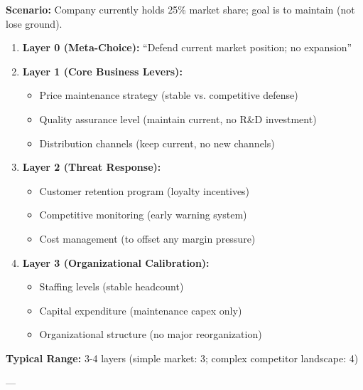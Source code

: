 \documentclass[11pt, a4paper]{article}
\begin{document}
\begin{tcolorbox}[colback=gray!5!white, colframe=gray!75!black, title=Example: Organizational Steady State (e.g., Market Share Maintenance)]

\textbf{Scenario:} Company currently holds 25\% market share; goal is to maintain (not lose ground).

\begin{enumerate}
    \item \textbf{Layer 0 (Meta-Choice):} ``Defend current market position; no expansion''

    \item \textbf{Layer 1 (Core Business Levers):}
    \begin{itemize}[nosep]
        \item Price maintenance strategy (stable vs. competitive defense)
        \item Quality assurance level (maintain current, no R\&D investment)
        \item Distribution channels (keep current, no new channels)
    \end{itemize}

    \item \textbf{Layer 2 (Threat Response):}
    \begin{itemize}[nosep]
        \item Customer retention program (loyalty incentives)
        \item Competitive monitoring (early warning system)
        \item Cost management (to offset any margin pressure)
    \end{itemize}

    \item \textbf{Layer 3 (Organizational Calibration):}
    \begin{itemize}[nosep]
        \item Staffing levels (stable headcount)
        \item Capital expenditure (maintenance capex only)
        \item Organizational structure (no major reorganization)
    \end{itemize}
\end{enumerate}

\textbf{Typical Range:} 3-4 layers (simple market: 3; complex competitor landscape: 4)

\end{tcolorbox}

---
\end{document}
